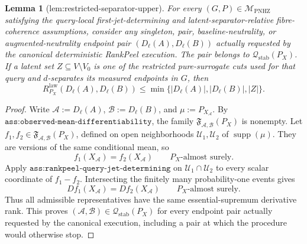 \documentclass{article}
\newtheorem{lemma}{Lemma}
\begin{document}
\begin{lemma}[lem:restricted-separator-upper]\label{lem:restricted-separator-upper}
For every \((G,P)\in\mathcal M_{\mathrm{PNHZ}}\) satisfying the query-local first-jet-determining and latent-separator-relative fibre-coherence assumptions, consider any singleton, pair, baseline-neutrality, or augmented-neutrality endpoint pair \((D_\ell(A),D_\ell(B))\) actually requested by the canonical deterministic RankPeel execution.  The pair belongs to \(\mathcal Q_{\mathrm{stab}}(P_X)\).  If a latent set \(Z\subseteq V\setminus V_0\) is one of the restricted pure-surrogate cuts used for that query and \(d\)-separates its measured endpoints in \(G\), then
\[
 R^{\mathrm{law}}_{P_X}(D_\ell(A),D_\ell(B))
 \leq
 \min\{|D_\ell(A)|,|D_\ell(B)|,|Z|\}.
\]
\end{lemma}
\begin{proof}
Write \(\mathcal A:=D_\ell(A)\), \(\mathcal B:=D_\ell(B)\), and \(\mu:=P_{X_{\mathcal A}}\).  By \(\texttt{ass:observed-mean-differentiability}\), the family \(\mathfrak F_{\mathcal A,\mathcal B}(P_X)\) is nonempty.  Let \(f_1,f_2\in\mathfrak F_{\mathcal A,\mathcal B}(P_X)\), defined on open neighborhoods \(\mathcal U_1,\mathcal U_2\) of \(\operatorname{supp}(\mu)\).  They are versions of the same conditional mean, so
\[
 f_1(X_{\mathcal A})=f_2(X_{\mathcal A})
 \qquad P_X\text{-almost surely}. \tag{1}
\]
Apply \(\texttt{ass:rankpeel-query-jet-determining}\) on \(\mathcal U_1\cap\mathcal U_2\) to every scalar coordinate of \(f_1-f_2\).  Intersecting the finitely many probability-one events gives
\[
 Df_1(X_{\mathcal A})=Df_2(X_{\mathcal A})
 \qquad P_X\text{-almost surely}. \tag{2}
\]
Thus all admissible representatives have the same essential-supremum derivative rank.  This proves \((\mathcal A,\mathcal B)\in\mathcal Q_{\mathrm{stab}}(P_X)\) for every endpoint pair actually requested by the canonical execution, including a pair at which the procedure would otherwise stop.


\end{proof}
\end{document}
